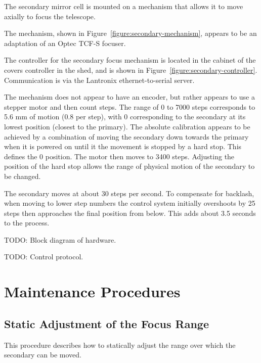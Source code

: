 The secondary mirror cell is mounted on a mechanism that allows it to move axially to focus the telescope.

The mechanism, shown in Figure~\ref{figure:secondary-mechanism}, appears to be an adaptation of an Optec TCF-S focuser. 

The controller for the secondary focus mechanism is located in the cabinet of the covers controller in the shed, and is shown in Figure~\ref{figure:secondary-controller}. Communication is via the Lantronix ethernet-to-serial server.

The mechanism does not appear to have an encoder, but rather appears to use a stepper motor and then count steps. The range of 0 to 7000 steps corresponds to 5.6 mm of motion (0.8 {\micron} per step), with 0 corresponding to the secondary at its lowest position (closest to the primary). The absolute calibration appears to be achieved by a combination of moving the secondary down towards the primary when it is powered on until it the movement is stopped by a hard stop. This defines the 0 position. The motor then moves to 3400 steps. Adjusting the position of the hard stop allows the range of physical motion of the secondary to be changed.

The secondary moves at about 30 steps per second. To compensate for backlash, when moving to lower step numbers the control system initially overshoots by 25 steps then approaches the final position from below. This adds about 3.5 seconds to the process.

TODO: Block diagram of hardware.

TODO: Control protocol.

\section{Maintenance Procedures}

\subsection{Static Adjustment of the Focus Range}
\label{section:secondary:static-adjustmentl}

This procedure describes how to statically adjust the range over which the secondary can be moved.

